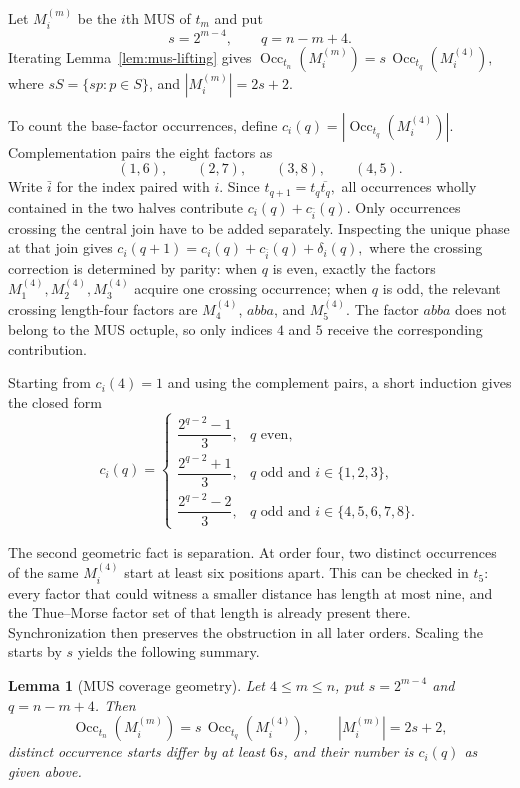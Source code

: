 \documentclass[10pt,a4paper]{article}
\newtheorem{lemma}[theorem]{Lemma}
\theoremstyle{definition}\newtheorem{definition}[theorem]{Definition}
\theoremstyle{remark}\newtheorem{remark}[theorem]{Remark}
\newcommand{\Occ}{\operatorname{Occ}}
\begin{document}
Let $M_i^{(m)}$ be the $i$th MUS of $t_m$ and put
\[
 s=2^{m-4},
 \qquad
 q=n-m+4.
\]
Iterating Lemma~\ref{lem:mus-lifting} gives
$
 \Occ_{t_n}(M_i^{(m)})
   =s\,\Occ_{t_q}(M_i^{(4)}),
$
where $sS=\{sp:p\in S\}$, and
$
 |M_i^{(m)}|=2s+2.
$

To count the base-factor occurrences, define
$
 c_i(q)=|\Occ_{t_q}(M_i^{(4)})|.
$
Complementation pairs the eight factors as
\[
(1,6),\qquad(2,7),\qquad(3,8),\qquad(4,5).
\]
Write $\bar i$ for the index paired with $i$.  Since
$
 t_{q+1}=t_q\overline{t_q},
$
all occurrences wholly contained in the two halves contribute
$
 c_i(q)+c_{\bar i}(q).
$
Only occurrences crossing the central join have to be added separately.  Inspecting the unique phase at that join gives
$
 c_i(q+1)=c_i(q)+c_{\bar i}(q)+\delta_i(q),
$
where the crossing correction is determined by parity: when $q$ is even, exactly the factors $M_1^{(4)},M_2^{(4)},M_3^{(4)}$ acquire one crossing occurrence; when $q$ is odd, the relevant crossing length-four factors are $M_4^{(4)}$, $abba$, and $M_5^{(4)}$.  The factor $abba$ does not belong to the MUS octuple, so only indices $4$ and $5$ receive the corresponding contribution.

Starting from $c_i(4)=1$ and using the complement pairs, a short induction gives the closed form
\[
 c_i(q)=
 \begin{cases}
 \dfrac{2^{q-2}-1}{3},
   & q\text{ even},\\[1.1ex]
 \dfrac{2^{q-2}+1}{3},
   & q\text{ odd and }i\in\{1,2,3\},\\[1.1ex]
 \dfrac{2^{q-2}-2}{3},
   & q\text{ odd and }i\in\{4,5,6,7,8\}.
 \end{cases}
\]

The second geometric fact is separation.  At order four, two distinct occurrences of the same $M_i^{(4)}$ start at least six positions apart.  This can be checked in $t_5$: every factor that could witness a smaller distance has length at most nine, and the Thue--Morse factor set of that length is already present there.  Synchronization then preserves the obstruction in all later orders.  Scaling the starts by $s$ yields the following summary.

\begin{lemma}[MUS coverage geometry]
\label{lem:mus-coverage-geometry-extended}
Let $4\le m\le n$, put $s=2^{m-4}$ and $q=n-m+4$.  Then
\[
 \Occ_{t_n}(M_i^{(m)})
   =s\,\Occ_{t_q}(M_i^{(4)}),
 \qquad
 |M_i^{(m)}|=2s+2,
\]
distinct occurrence starts differ by at least $6s$, and their number is $c_i(q)$ as given above.
\end{lemma}
\end{document}
